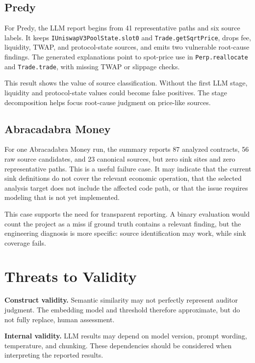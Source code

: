 \subsection{Predy}

For Predy, the LLM report begins from 41 representative paths and six source
labels. It keeps \texttt{IUniswapV3PoolState.slot0} and
\texttt{Trade.getSqrtPrice}, drops fee, liquidity, TWAP, and protocol-state
sources, and emits two vulnerable root-cause findings. The generated
explanations point to spot-price use in \texttt{Perp.reallocate} and
\texttt{Trade.trade}, with missing TWAP or slippage checks.

This result shows the value of source classification. Without the first LLM
stage, liquidity and protocol-state values could become false positives. The
stage decomposition helps focus root-cause judgment on price-like sources.

\subsection{Abracadabra Money}

For one Abracadabra Money run, the summary reports 87 analyzed contracts, 56
raw source candidates, and 23 canonical sources, but zero sink sites and zero
representative paths. This is a useful failure case. It may indicate that the
current sink definitions do not cover the relevant economic operation, that the
selected analysis target does not include the affected code path, or that the
issue requires modeling that is not yet implemented.

This case supports the need for transparent reporting. A binary evaluation
would count the project as a miss if ground truth contains a relevant finding,
but the engineering diagnosis is more specific: source identification may work,
while sink coverage fails.

\section{Threats to Validity}

\textbf{Construct validity.} Semantic similarity may not perfectly represent
auditor judgment. The embedding model and threshold therefore approximate, but
do not fully replace, human assessment.

\textbf{Internal validity.} LLM results may depend on model version, prompt
wording, temperature, and chunking. These dependencies should be considered
when interpreting the reported results.

